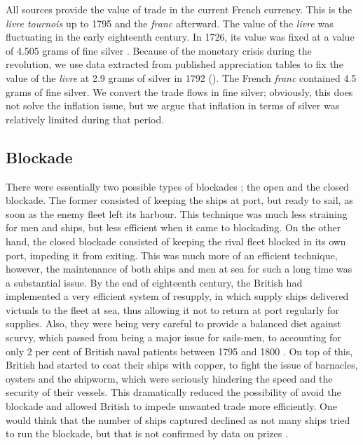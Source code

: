 \documentclass[12pt,a4paper,notitlepage,english]{article}
\begin{document}
\begin{appendix}
All sources provide the value of trade in the current French currency. This is the \textit{livre tournois} up to 1795 and the \textit{franc} afterward. The value of the \textit{livre} was fluctuating in the early eighteenth century. In 1726, its value was fixed at a value of 4.505 grams of fine silver \citep{Dewailly1857}. Because of the monetary crisis during the revolution, we use data extracted from published appreciation tables to fix the value of the \textit{livre} at 2.9 grams of silver in 1792 (\cite{Hoffman2000}). The French \textit{franc} contained 4.5 grams of fine silver. We convert the trade flows in fine silver; obviously, this does not solve the inflation issue, but we argue that inflation in terms of silver was relatively limited during that period. 

\subsection{Blockade}\label{app:appendix_blockade}
There were essentially two possible types of blockades \citep{Corbett2004}; the open and the closed blockade. The former consisted of keeping the ships at port, but ready to sail, as soon as the enemy fleet left its harbour. This technique was much less straining for men and ships, but less efficient when it came to blockading. On the other hand, the closed blockade consisted of keeping the rival fleet blocked in its own port, impeding it from exiting. This was much more of an efficient technique, however, the maintenance of both ships and men at sea for such a long time was a substantial issue.
By the end of eighteenth century, the British had implemented a very efficient system of resupply, in which supply ships delivered victuals to the fleet at sea, thus allowing it not to return at port regularly for supplies. 
Also, they were being very careful to provide a balanced diet against scurvy, which passed from being a major issue for sails-men, to accounting for only 2 per cent of British naval patients between 1795 and 1800 \citep{Rodger2005}. On top of this, British had started to coat their ships with copper, to fight the issue of barnacles, oysters and the shipworm, which were seriously hindering the speed and the security of their vessels. This dramatically reduced the possibility of avoid the blockade and allowed British to impede unwanted trade more efficiently.
One would think that the number of ships captured declined as not many ships tried to run the blockade, but that is not confirmed by data on prizes \cite{Benjamin2009}.


\end{appendix}
\end{document}
